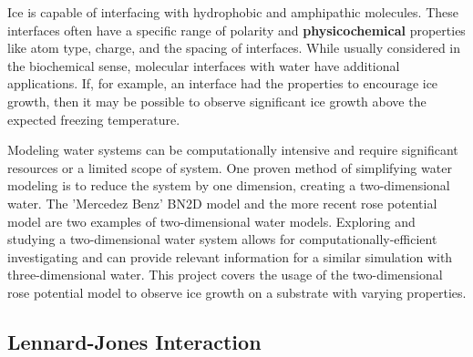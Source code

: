 Ice is capable of interfacing with hydrophobic and amphipathic molecules. 
These interfaces often have a specific range of polarity and \textbf{physicochemical} properties like atom type, charge, and the spacing of interfaces.
While usually considered in the biochemical sense, molecular interfaces with water have additional applications. 
If, for example, an interface had the properties to encourage ice growth, then it may be possible to observe significant ice growth above the expected freezing temperature. 

Modeling water systems can be computationally intensive and require significant resources or a limited scope of system.
One proven method of simplifying water modeling is to reduce the system by one dimension, creating a two-dimensional water.
The 'Mercedez Benz' BN2D model and the more recent rose potential model are two examples of two-dimensional water models.
Exploring and studying a two-dimensional water system allows for computationally-efficient investigating and can provide relevant information for a similar simulation with three-dimensional water.
This project covers the usage of the two-dimensional rose potential model to observe ice growth on a substrate with varying properties.

\subsection{Lennard-Jones Interaction}






